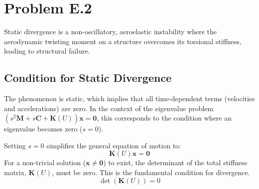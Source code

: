 \documentclass{article}
\begin{document}
\newpage
\section{Problem E.2}
Static divergence is a non-oscillatory, aeroelastic instability where the aerodynamic twisting moment on a structure overcomes its torsional stiffness, leading to structural failure.

\subsection{Condition for Static Divergence}
The phenomenon is static, which implies that all time-dependent terms (velocities and accelerations) are zero. In the context of the eigenvalue problem $(s^2\mathbf{M} + s\mathbf{C} + \mathbf{K}(U))\mathbf{x} = \mathbf{0}$, this corresponds to the condition where an eigenvalue becomes zero ($s=0$).

\newline\newline
Setting $s=0$ simplifies the general equation of motion to:
\begin{equation}
    \mathbf{K}(U)\mathbf{x} = \mathbf{0}
\end{equation}
For a non-trivial solution ($\mathbf{x} \neq \mathbf{0}$) to exist, the determinant of the total stiffness matrix, $\mathbf{K}(U)$, must be zero. This is the fundamental condition for divergence.
\begin{equation}
    \det(\mathbf{K}(U)) = 0
\end{equation}
\end{document}
